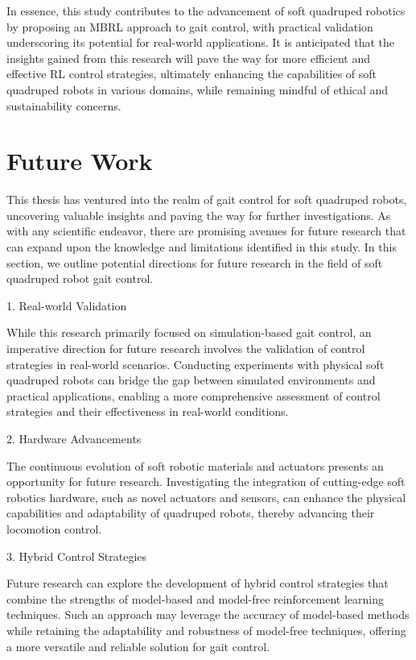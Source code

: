 In essence, this study contributes to the advancement of soft quadruped robotics by proposing an MBRL approach to gait control, with practical validation underscoring its potential for real-world applications. It is anticipated that the insights gained from this research will pave the way for more efficient and effective RL control strategies, ultimately enhancing the capabilities of soft quadruped robots in various domains, while remaining mindful of ethical and sustainability concerns.

\section{Future Work}
This thesis has ventured into the realm of gait control for soft quadruped robots, uncovering valuable insights and paving the way for further investigations. As with any scientific endeavor, there are promising avenues for future research that can expand upon the knowledge and limitations identified in this study. In this section, we outline potential directions for future research in the field of soft quadruped robot gait control.

1. Real-world Validation

While this research primarily focused on simulation-based gait control, an imperative direction for future research involves the validation of control strategies in real-world scenarios. Conducting experiments with physical soft quadruped robots can bridge the gap between simulated environments and practical applications, enabling a more comprehensive assessment of control strategies and their effectiveness in real-world conditions.

2. Hardware Advancements

The continuous evolution of soft robotic materials and actuators presents an opportunity for future research. Investigating the integration of cutting-edge soft robotics hardware, such as novel actuators and sensors, can enhance the physical capabilities and adaptability of quadruped robots, thereby advancing their locomotion control.

3. Hybrid Control Strategies

Future research can explore the development of hybrid control strategies that combine the strengths of model-based and model-free reinforcement learning techniques. Such an approach may leverage the accuracy of model-based methods while retaining the adaptability and robustness of model-free techniques, offering a more versatile and reliable solution for gait control.

